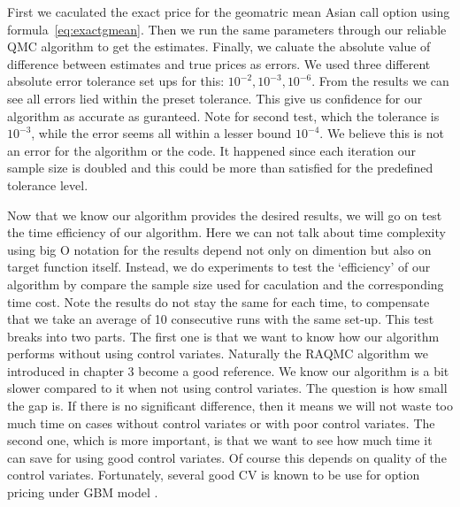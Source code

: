 First we caculated the exact price for the geomatric mean Asian call option using formula~\eqref{eq:exactgmean}. 
Then we run the same parameters through our reliable QMC algorithm to get the estimates. 
Finally, we caluate the absolute value of difference between estimates and true prices as errors. 
We used three different absolute error tolerance set ups for this: $10^{-2}, 10^{-3}, 10^{-6}$.   
From the results we can see all errors lied within the preset tolerance. 
This give us confidence for our algorithm as accurate as guranteed. 
Note for second test, which the tolerance is $10^{-3}$, while the error seems all within a lesser bound $10^{-4}$. 
We believe this is not an error for the algorithm or the code.  
It happened since each iteration our sample size is doubled and this could be more than satisfied for the predefined tolerance level.



Now that we know our algorithm provides the desired results, we will go on test the time efficiency of our algorithm. 
Here we can not talk about time complexity using big O notation for the results depend not only on dimention but also on target function itself. 
Instead, we do experiments to test the `efficiency' of our algorithm by compare the sample size used for caculation and the corresponding time cost. 
Note the results do not stay the same for each time, to compensate that we take an average of 10 consecutive runs with the same set-up. 
This test breaks into two parts. 
The first one is that we want to know how our algorithm performs without using control variates. 
Naturally the RAQMC algorithm we introduced in chapter 3 become a good reference. 
We know our algorithm is a bit slower compared to it when not using control variates. The question is how small the gap is. 
If there is no significant difference, then it means we will not waste too much time on cases without control variates or with poor control variates. 
The second one, which is more important, is that we want to see how much time it can save for using good control variates. Of course this depends on quality of the control variates. Fortunately, several good CV is known to be use for option pricing under GBM model \cite{lidebrandt2007variance}.         

